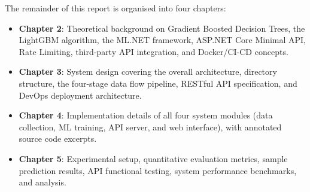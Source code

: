 The remainder of this report is organised into four chapters:
\begin{itemize}
  \item \textbf{Chapter 2}: Theoretical background on Gradient Boosted Decision Trees, the LightGBM algorithm, the ML.NET framework, ASP.NET Core Minimal API, Rate Limiting, third-party API integration, and Docker/CI-CD concepts.
  \item \textbf{Chapter 3}: System design covering the overall architecture, directory structure, the four-stage data flow pipeline, RESTful API specification, and DevOps deployment architecture.
  \item \textbf{Chapter 4}: Implementation details of all four system modules (data collection, ML training, API server, and web interface), with annotated source code excerpts.
  \item \textbf{Chapter 5}: Experimental setup, quantitative evaluation metrics, sample prediction results, API functional testing, system performance benchmarks, and analysis.
\end{itemize}

\newpage
